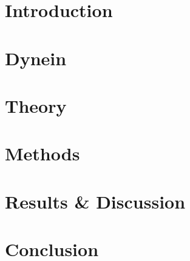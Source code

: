 \documentclass[12pt]{report}
\begin{document}
	
	\chapter{Introduction}
	
	\chapter{Dynein}
	
	\chapter{Theory}
	
	\chapter{Methods}
	
	\chapter{Results \& Discussion}
	
	\chapter{Conclusion}
	


\end{document}
